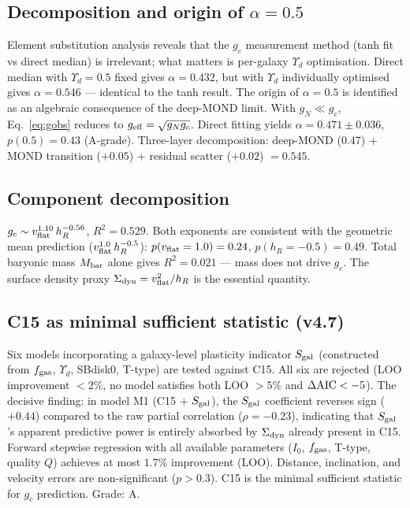 \documentclass[11pt,a4paper]{article}
\newcommand{\gN}{g_{N}}
\newcommand{\gc}{g_{c}}
\newcommand{\vflat}{v_{\rm flat}}
\newcommand{\hR}{h_{R}}
\newcommand{\Yd}{\Upsilon_{d}}
\newcommand{\sigdyn}{\Sigma_{\rm dyn}}
\newcommand{\Mbar}{M_{\rm bar}}
\newcommand{\fgas}{f_{\rm gas}}
\newcommand{\Sgal}{S_{\rm gal}}
\newcommand{\AIC}{\Delta{\rm AIC}}
\begin{document}
\subsection{Decomposition and origin of $\alpha = 0.5$}
Element substitution analysis reveals that the $\gc$ measurement method (tanh fit vs direct median) is
irrelevant; what matters is per-galaxy $\Yd$ optimisation. Direct median with $\Yd = 0.5$ fixed gives
$\alpha = 0.432$, but with $\Yd$ individually optimised gives $\alpha = 0.546$ --- identical to the tanh result.
The origin of $\alpha = 0.5$ is identified as an algebraic consequence of the deep-MOND limit. With
$\gN \ll \gc$, Eq.~\eqref{eq:gobs} reduces to $g_{\rm eff} = \sqrt{\gN\gc}$. Direct fitting yields
$\alpha = 0.471 \pm 0.036$, $p(0.5) = 0.43$ (A-grade). Three-layer decomposition: deep-MOND (0.47) +
MOND transition ($+0.05$) + residual scatter ($+0.02$) $= 0.545$.

\subsection{Component decomposition}
$\gc \sim \vflat^{1.10}\,\hR^{-0.56}$, $R^2 = 0.529$. Both exponents are consistent with the geometric mean
prediction ($\vflat^{1.0}\,\hR^{-0.5}$): $p(\vflat = 1.0) = 0.24$, $p(\hR = -0.5) = 0.49$. Total baryonic mass
$\Mbar$ alone gives $R^2 = 0.021$ --- mass does not drive $\gc$. The surface density proxy
$\sigdyn = \vflat^2/\hR$ is the essential quantity.

\subsection{C15 as minimal sufficient statistic (v4.7)}
Six models incorporating a galaxy-level plasticity indicator $\Sgal$ (constructed from $\fgas$, $\Yd$,
SBdisk0, T-type) are tested against C15. All six are rejected (LOO improvement $< 2\%$, no model satisfies
both LOO $> 5\%$ and $\AIC < -5$). The decisive finding: in model M1 (C15 + $\Sgal$), the $\Sgal$
coefficient reverses sign ($+0.44$) compared to the raw partial correlation ($\rho = -0.23$), indicating
that $\Sgal$'s apparent predictive power is entirely absorbed by $\sigdyn$ already present in C15. Forward
stepwise regression with all available parameters ($I_0$, $\fgas$, T-type, quality $Q$) achieves at most
$1.7\%$ improvement (LOO). Distance, inclination, and velocity errors are non-significant ($p > 0.3$). C15
is the minimal sufficient statistic for $\gc$ prediction. Grade: A.

\end{document}
